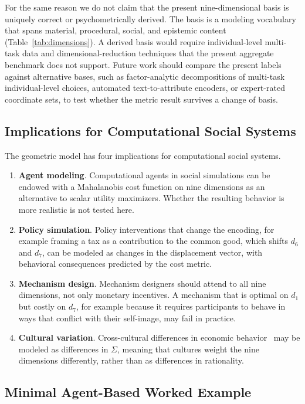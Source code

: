 \documentclass[journal]{IEEEtran}
\begin{document}
For the same reason we do not claim that the present nine-dimensional basis is uniquely correct or psychometrically derived.
The basis is a modeling vocabulary that spans material, procedural, social, and epistemic content (Table~\ref{tab:dimensions}).
A derived basis would require individual-level multi-task data and dimensional-reduction techniques that the present aggregate benchmark does not support.
Future work should compare the present labels against alternative bases, such as factor-analytic decompositions of multi-task individual-level choices, automated text-to-attribute encoders, or expert-rated coordinate sets, to test whether the metric result survives a change of basis.

\subsection{Implications for Computational Social Systems}

The geometric model has four implications for computational social systems.
\begin{enumerate}
    \item \textbf{Agent modeling}. Computational agents in social simulations can be endowed with a Mahalanobis cost function on nine dimensions as an alternative to scalar utility maximizers. Whether the resulting behavior is more realistic is not tested here.
    \item \textbf{Policy simulation}. Policy interventions that change the encoding, for example framing a tax as a contribution to the common good, which shifts $d_6$ and $d_7$, can be modeled as changes in the displacement vector, with behavioral consequences predicted by the cost metric.
    \item \textbf{Mechanism design}. Mechanism designers should attend to all nine dimensions, not only monetary incentives. A mechanism that is optimal on $d_1$ but costly on $d_7$, for example because it requires participants to behave in ways that conflict with their self-image, may fail in practice.
    \item \textbf{Cultural variation}. Cross-cultural differences in economic behavior~\cite{henrich2010} may be modeled as differences in $\Sigma$, meaning that cultures weight the nine dimensions differently, rather than as differences in rationality.
\end{enumerate}

\subsection{Minimal Agent-Based Worked Example}
\end{document}
